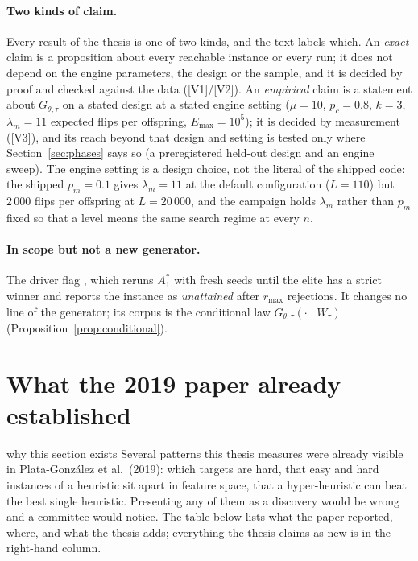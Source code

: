\documentclass[a4paper,11pt]{article}
\newcommand{\Emax}{E_{\max}}
\newcommand{\code}[1]{\path{#1}}
\newcommand{\Astar}{A_{1}^{*}}
\newcommand{\Gtt}{G_{\theta,\tau}}
\newcommand{\evid}[1]{\textcolor{inkSoft}{\scriptsize[#1]}}
\theoremstyle{plain}
\theoremstyle{definition}
\theoremstyle{remark}
\begin{document}
\paragraph{Two kinds of claim.} Every result of the thesis is one of two kinds, and the text
labels which. An \emph{exact} claim is a proposition about every reachable instance or every
run; it does not depend on the engine parameters, the design or the sample, and it is decided
by proof and checked against the data (\evid{V1}/\evid{V2}). An \emph{empirical} claim is a
statement about $\Gtt$ on a stated design at a stated engine setting
($\mu=10$, $p_c=0.8$, $k=3$, $\lambda_m=11$ expected flips per offspring,
$\Emax=10^{5}$); it is decided by measurement (\evid{V3}), and its reach beyond that design
and setting is tested only where Section~\ref{sec:phases} says so (a preregistered held-out
design and an engine sweep). The engine setting is a design choice, not the literal of the
shipped code: the shipped $p_m=0.1$ gives $\lambda_m=11$ at the default configuration
($L=110$) but $2\,000$ flips per offspring at $L=20\,000$, and the campaign holds $\lambda_m$
rather than $p_m$ fixed so that a level means the same search regime at every $n$.

\paragraph{In scope but not a new generator.} The driver flag \code{--require-strict}, which
reruns $\Astar$ with fresh seeds until the elite has a strict winner and reports the
instance as \emph{unattained} after $r_{\max}$ rejections. It changes no line of the
generator; its corpus is the conditional law $\Gtt(\cdot\mid W_\tau)$
(Proposition~\ref{prop:conditional}).

\section{What the 2019 paper already established}\label{sec:prior}

\begin{plain}{why this section exists}
Several patterns this thesis measures were already visible in Plata-Gonz\'alez et al.\
(2019): which targets are hard, that easy and hard instances of a heuristic sit apart in
feature space, that a hyper-heuristic can beat the best single heuristic. Presenting any of
them as a discovery would be wrong and a committee would notice. The table below lists what
the paper reported, where, and what the thesis adds; everything the thesis claims as new is
in the right-hand column.
\end{plain}
\end{document}

